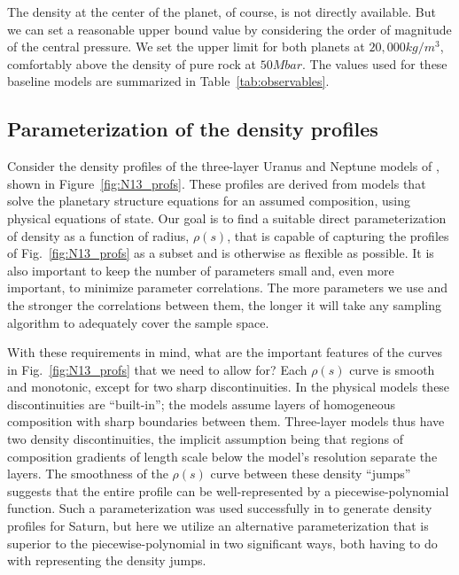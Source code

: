 The density at the center of the planet, of course, is not directly available.
But we can set a reasonable upper bound value by considering the order of
magnitude of the central pressure. We set the upper limit for both planets at
$20,000\unit{kg/m^3}$, comfortably above the density of pure rock at
${50}\unit{Mbar}$. The values used for these baseline models are summarized in
Table~\ref{tab:observables}.



\subsection{Parameterization of the density profiles}\label{sec:params}

Consider the density profiles of the three-layer Uranus and Neptune models of
\citet{Nettelmann2013b}, shown in Figure~\ref{fig:N13_profs}. These profiles are
derived from models that solve the planetary structure equations for an assumed
composition, using physical equations of state. Our goal is to find a suitable
direct parameterization of density as a function of radius, $\rho(s)$, that is
capable of capturing the profiles of Fig.~\ref{fig:N13_profs} as a subset and is
otherwise as flexible as possible. It is also important to keep the number of
parameters small and, even more important, to minimize parameter correlations.
The more parameters we use and the stronger the correlations between them, the
longer it will take any sampling algorithm to adequately cover the sample space.

With these requirements in mind, what are the important features of the curves
in Fig.~\ref{fig:N13_profs} that we need to allow for? Each $\rho(s)$ curve is
smooth and monotonic, except for two sharp discontinuities. In the physical
models these discontinuities are ``built-in''; the models assume layers of
homogeneous composition with sharp boundaries between them. Three-layer models
thus have two density discontinuities, the implicit assumption being that
regions of composition gradients of length scale below the model's resolution
separate the layers. The smoothness of the $\rho(s)$ curve between these density
``jumps'' suggests that the entire profile can be well-represented by a
piecewise-polynomial function. Such a parameterization was used successfully in
\citep{Movshovitz2020} to generate density profiles for Saturn, but here we
utilize an alternative parameterization that is superior to the
piecewise-polynomial in two significant ways, both having to do with
representing the density jumps.

